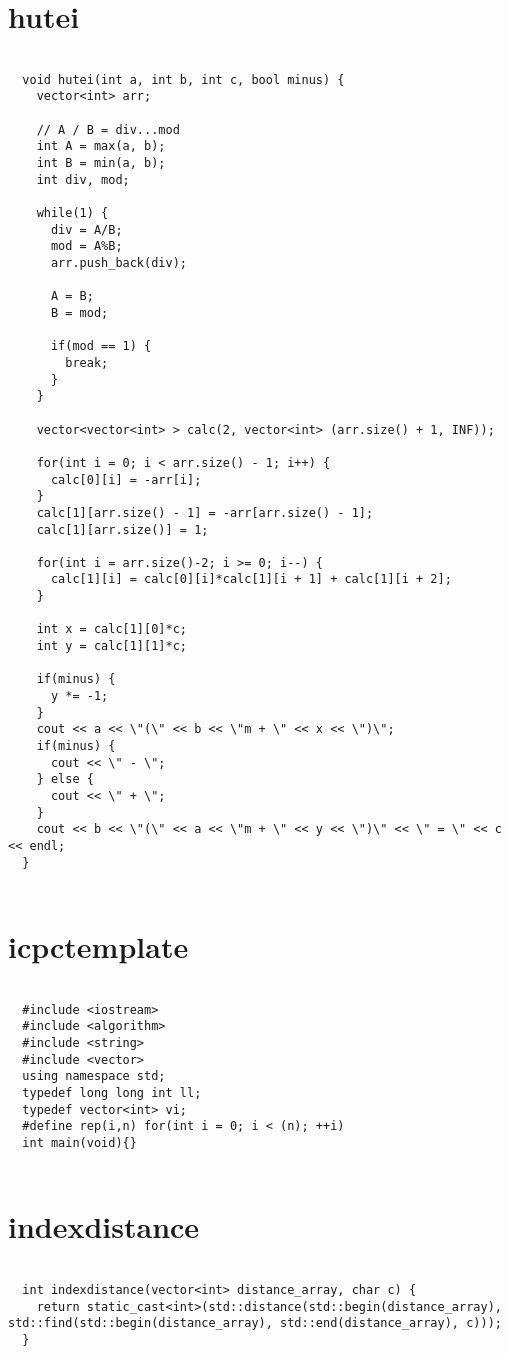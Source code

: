 \documentclass{jsarticle}
\begin{document}
\color{white}
\section{hutei}
\color{black}
\begin{lstlisting}[caption=hutei]

  void hutei(int a, int b, int c, bool minus) {
    vector<int> arr;
  
    // A / B = div...mod
    int A = max(a, b);
    int B = min(a, b);
    int div, mod;
  
    while(1) {
      div = A/B;
      mod = A%B;
      arr.push_back(div);
  
      A = B;
      B = mod;
  
      if(mod == 1) {
        break;
      }
    }
  
    vector<vector<int> > calc(2, vector<int> (arr.size() + 1, INF));
  
    for(int i = 0; i < arr.size() - 1; i++) {
      calc[0][i] = -arr[i];
    }
    calc[1][arr.size() - 1] = -arr[arr.size() - 1];
    calc[1][arr.size()] = 1;
  
    for(int i = arr.size()-2; i >= 0; i--) {
      calc[1][i] = calc[0][i]*calc[1][i + 1] + calc[1][i + 2];
    }
  
    int x = calc[1][0]*c;
    int y = calc[1][1]*c;
  
    if(minus) {
      y *= -1;
    }
    cout << a << \"(\" << b << \"m + \" << x << \")\";
    if(minus) {
      cout << \" - \";
    } else {
      cout << \" + \";
    }
    cout << b << \"(\" << a << \"m + \" << y << \")\" << \" = \" << c << endl;
  }
  

\end{lstlisting}

\color{white}
\section{icpctemplate}
\color{black}
\begin{lstlisting}[caption=icpctemplate]

  #include <iostream>
  #include <algorithm>
  #include <string>
  #include <vector>
  using namespace std;
  typedef long long int ll;
  typedef vector<int> vi;
  #define rep(i,n) for(int i = 0; i < (n); ++i)
  int main(void){}
  

\end{lstlisting}

\color{white}
\section{indexdistance}
\color{black}
\begin{lstlisting}[caption=indexdistance]

  int indexdistance(vector<int> distance_array, char c) {
    return static_cast<int>(std::distance(std::begin(distance_array), std::find(std::begin(distance_array), std::end(distance_array), c)));
  }
  

\end{lstlisting}
\end{document}
